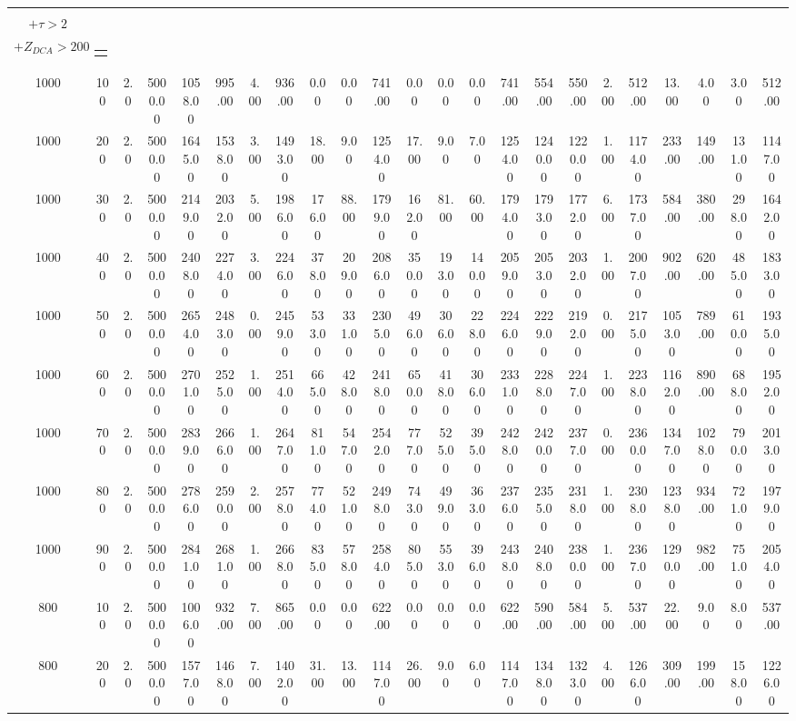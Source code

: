 \documentclass[8pt]{extarticle}
\begin{document}
\begin{longtable}{|c|c|c|c|c|c|c|c|c|c|c|c|c|c|c|c|c|c|c|c|c|c|c|}
\begin{tabular}{@{}c@{}} $E_T^{miss} > 75$ \\ $+ \tau > 2$ \\ $+Z_{DCA} > 200$\end{tabular} & \begin{tabular}{@{}c@{}} $E_{T}^{miss} > 75$ $+ \tau < 4$ \end{tabular} \\ 
\hline 
1000&100&2.0&5000.00&1058.00&995.00&4.00&936.00&0.00&0.00&741.00&0.00&0.00&0.00&741.00&554.00&550.00&2.00&512.00&13.00&4.00&3.00&512.00\\ 
\hline 
1000&200&2.0&5000.00&1645.00&1538.00&3.00&1493.00&18.00&9.00&1254.00&17.00&9.00&7.00&1254.00&1240.00&1220.00&1.00&1174.00&233.00&149.00&131.00&1147.00\\ 
\hline 
1000&300&2.0&5000.00&2149.00&2032.00&5.00&1986.00&176.00&88.00&1799.00&162.00&81.00&60.00&1794.00&1793.00&1772.00&6.00&1737.00&584.00&380.00&298.00&1642.00\\ 
\hline 
1000&400&2.0&5000.00&2408.00&2274.00&3.00&2246.00&378.00&209.00&2086.00&350.00&193.00&140.00&2059.00&2053.00&2032.00&1.00&2007.00&902.00&620.00&485.00&1833.00\\ 
\hline 
1000&500&2.0&5000.00&2654.00&2483.00&0.00&2459.00&533.00&331.00&2305.00&496.00&306.00&228.00&2246.00&2229.00&2192.00&0.00&2175.00&1053.00&789.00&610.00&1935.00\\ 
\hline 
1000&600&2.0&5000.00&2701.00&2525.00&1.00&2514.00&665.00&428.00&2418.00&650.00&418.00&306.00&2331.00&2288.00&2247.00&1.00&2238.00&1162.00&890.00&688.00&1952.00\\ 
\hline 
1000&700&2.0&5000.00&2839.00&2666.00&1.00&2647.00&811.00&547.00&2542.00&777.00&525.00&395.00&2428.00&2420.00&2377.00&0.00&2360.00&1347.00&1028.00&790.00&2013.00\\ 
\hline 
1000&800&2.0&5000.00&2786.00&2590.00&2.00&2578.00&774.00&521.00&2498.00&743.00&499.00&363.00&2376.00&2355.00&2318.00&1.00&2308.00&1238.00&934.00&721.00&1979.00\\ 
\hline 
1000&900&2.0&5000.00&2841.00&2681.00&1.00&2668.00&835.00&578.00&2584.00&805.00&553.00&396.00&2438.00&2408.00&2380.00&1.00&2367.00&1290.00&982.00&751.00&2054.00\\ 
\hline 
800&100&2.0&5000.00&1006.00&932.00&7.00&865.00&0.00&0.00&622.00&0.00&0.00&0.00&622.00&590.00&584.00&5.00&537.00&22.00&9.00&8.00&537.00\\ 
\hline 
800&200&2.0&5000.00&1577.00&1468.00&7.00&1402.00&31.00&13.00&1147.00&26.00&9.00&6.00&1147.00&1348.00&1323.00&4.00&1266.00&309.00&199.00&158.00&1226.00\\ 

\end{longtable}
\end{document}
